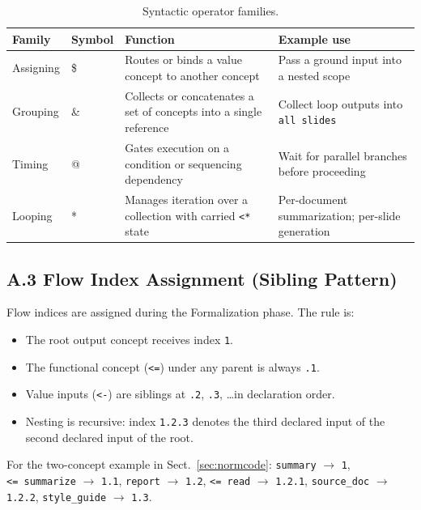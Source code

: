 \begin{table}[h]
\centering
\caption{Syntactic operator families.}
\label{tab:operators}
\begin{tabular}{@{}p{1.8cm}p{1.2cm}p{4.4cm}p{4.0cm}@{}}
\toprule
\textbf{Family} & \textbf{Symbol} & \textbf{Function} & \textbf{Example use} \\
\midrule
Assigning & \$  & Routes or binds a value concept to another concept & Pass a ground input into a nested scope \\[4pt]
Grouping  & \&  & Collects or concatenates a set of concepts into a single reference & Collect loop outputs into \texttt{all slides} \\[4pt]
Timing    & @   & Gates execution on a condition or sequencing dependency & Wait for parallel branches before proceeding \\[4pt]
Looping   & *   & Manages iteration over a collection with carried \texttt{<*} state & Per-document summarization; per-slide generation \\
\bottomrule
\end{tabular}
\end{table}

\subsection*{A.3 Flow Index Assignment (Sibling Pattern)}

Flow indices are assigned during the Formalization phase. The rule is:
\begin{itemize}
  \item The root output concept receives index \texttt{1}.
  \item The functional concept (\texttt{<=}) under any parent is always \texttt{.1}.
  \item Value inputs (\texttt{<-}) are siblings at \texttt{.2}, \texttt{.3}, \ldots in
    declaration order.
  \item Nesting is recursive: index \texttt{1.2.3} denotes the third declared input of
    the second declared input of the root.
\end{itemize}

For the two-concept example in Sect.~\ref{sec:normcode}:
\texttt{summary} $\rightarrow$ \texttt{1},\quad
\texttt{<=\ summarize} $\rightarrow$ \texttt{1.1},\quad
\texttt{report} $\rightarrow$ \texttt{1.2},\quad
\texttt{<=\ read} $\rightarrow$ \texttt{1.2.1},\quad
\texttt{source\_doc} $\rightarrow$ \texttt{1.2.2},\quad
\texttt{style\_guide} $\rightarrow$ \texttt{1.3}.

